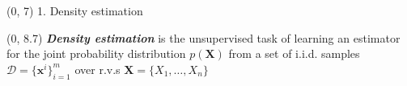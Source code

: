\documentclass[final]{beamer}
\begin{document}
\begin{frame}{}
\begin{textblock}{30}
\begin{minipage}[t]{15cm}
    \end{minipage}
  \end{textblock}
  
  
  \begin{textblock}{17.5}(0, 7)
    1. Density estimation
  \end{textblock}

  \begin{textblock}{17.5}(0, 8.7)
    \small
        \emph{\textbf{Density estimation}} is the unsupervised task of
    learning an estimator for the joint probability distribution
    $p(\mathbf{X})$ from a set of i.i.d. samples $\mathcal{D}=\{\mathbf
    x^i\}_{i=1}^m$ over r.v.s $\mathbf{X}=\{X_{1},\dots,X_{n}\}$\\[20pt]
    

\end{textblock}
\end{frame}
\end{document}
